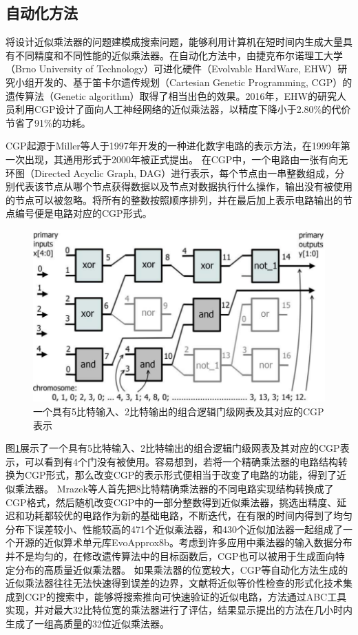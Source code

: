 \subsection{自动化方法}

将设计近似乘法器的问题建模成搜索问题，能够利用计算机在短时间内生成大量具有不同精度和不同性能的近似乘法器。在自动化方法中，由捷克布尔诺理工大学（Brno University of Technology）可进化硬件（Evolvable HardWare, EHW）研究小组开发的、基于笛卡尔遗传规划（Cartesian Genetic Programming, CGP）\cite{CGP_2008,CGP_2011}的遗传算法（Genetic algorithm）取得了相当出色的效果。2016年，EHW的研究人员利用CGP设计了面向人工神经网络的近似乘法器\cite{AC:AM:CGP_2016}，以精度下降小于2.80\%的代价节省了91\%的功耗。

CGP起源于Miller等人于1997年开发的一种进化数字电路的表示方法\cite{CGP_1997}，在1999年第一次出现\cite{CGP_1999}，其通用形式于2000年被正式提出\cite{CGP_2000}。
在CGP中，一个电路由一张有向无环图（Directed Acyclic Graph, DAG）进行表示，每个节点由一串整数组成，分别代表该节点从哪个节点获得数据以及节点对数据执行什么操作，输出没有被使用的节点可以被忽略。将所有的整数按照顺序排列，并在最后加上表示电路输出的节点编号便是电路对应的CGP形式。
\begin{figure}[!htb]
    \centering
    \includegraphics[width=0.8\linewidth]{figs/AC-AM-CGP.png}
    \caption{一个具有5比特输入、2比特输出的组合逻辑门级网表及其对应的CGP表示}
\label{AC:AM:CGP}
\end{figure}
图\ref{AC:AM:CGP}展示了一个具有5比特输入、2比特输出的组合逻辑门级网表及其对应的CGP表示，可以看到有4个门没有被使用。容易想到，若将一个精确乘法器的电路结构转换为CGP形式，那么改变CGP的表示形式便相当于改变了电路的功能，得到了近似乘法器。
Mrazek等人首先把8比特精确乘法器的不同电路实现结构转换成了CGP格式，然后随机改变CGP中的一部分整数得到近似乘法器，挑选出精度、延迟和功耗都较优的电路作为新的基础电路，不断迭代，在有限的时间内得到了均匀分布下误差较小、性能较高的471个近似乘法器，和430个近似加法器一起组成了一个开源的近似算术单元库EvoApprox8b\cite{AC:AM:CGP_Evoapprox8b}。考虑到许多应用中乘法器的输入数据分布并不是均匀的，在修改遗传算法中的目标函数后，CGP也可以被用于生成面向特定分布的高质量近似乘法器\cite{AC:AM:CGP_2019}。
如果乘法器的位宽较大，CGP等自动化方法生成的近似乘法器往往无法快速得到误差的边界，文献\cite{AC:AM:CGP_32bit}将近似等价性检查的形式化技术集成到CGP的搜索中，能够将搜索推向可快速验证的近似电路，方法通过ABC\cite{LS:ABC}工具实现，并对最大32比特位宽的乘法器进行了评估，结果显示提出的方法在几小时内生成了一组高质量的32位近似乘法器。

